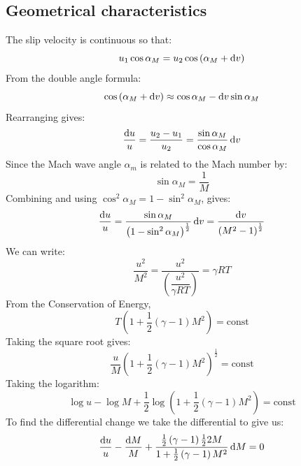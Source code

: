 \documentclass[class=report, crop=false, 12pt,a4paper]{standalone}
\begin{document}
\subsection{Geometrical characteristics}
The slip velocity is continuous so that:
\begin{equation}
    u_1 \cos \alpha_M = u_2 \cos\left(\alpha_M + \dif v\right)
\end{equation}
From the double angle formula:
\begin{equation}
    \cos \left(\alpha_M + \dif v \right) \approx \cos \alpha_M - \dif v \sin\alpha_M
\end{equation}
Rearranging gives:
\begin{equation}
    \frac{\dif u}{u} = \frac{u_2 - u_1}{u_2} = \frac{\sin\alpha_M}{\cos \alpha_M} \dif v
\end{equation}
Since the Mach wave angle $\alpha_m$ is related to the Mach number by:
\begin{equation}
    \sin\alpha_M = \frac{1}{M}
\end{equation}
Combining and using $\cos^2\alpha_M = 1 - \sin^2\alpha_M$, gives:
\begin{equation}
    \frac{\dif u }{u} = \frac{\sin \alpha_M}{\left(1 - \sin^2\alpha_M\right)^{\frac{1}{2}}}\dif v = \frac{\dif v}{\left(M^2 - 1\right)^{\frac{1}{2}}}
\end{equation}
We can write:
\begin{equation}
    \frac{u^2}{M^2} = \frac{u^2}{\left(\dfrac{u^2}{\gamma RT}\right)} = \gamma RT
\end{equation}
From the Conservation of Energy,
\begin{equation}
    T\left(1 + \frac{1}{2}\left(\gamma - 1\right)M^2\right) = \textrm{const}
\end{equation}
Taking the square root gives:
\begin{equation}
    \frac{u}{M}\left(1 + \frac{1}{2}\left(\gamma -1 \right)M^2\right)^{\frac{1}{2}} = \textrm{const}
\end{equation}
Taking the logarithm:
\begin{equation}
    \log u - \log M + \frac{1}{2}\log \left(1 + \frac{1}{2}\left(\gamma - 1\right)M^2\right) = \textrm{const}
\end{equation}
To find the differential change we take the differential to give us:
\begin{equation}
    \frac{\dif u}{u} - \frac{\dif M}{M} + \frac{\frac{1}{2}\left(\gamma - 1\right)\frac{1}{2}2M}{1 + \frac{1}{2}\left(\gamma - 1\right)M^2}\dif M = 0
\end{equation}
\end{document}
